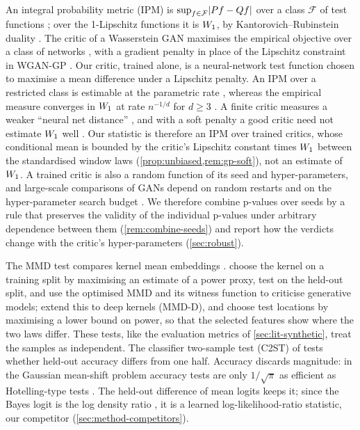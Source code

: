 An integral probability metric (IPM) is $\sup_{f\in\mathcal F}\lvert Pf-Qf\rvert$ over a class
$\mathcal F$ of test functions \citep{muller1997integral}; over the 1-Lipschitz functions it is
$W_{1}$, by Kantorovich--Rubinstein duality \citep{villani2009optimal}. The critic of a Wasserstein GAN maximises the empirical
objective over a class of networks \citep{arjovsky2017wasserstein}, with a gradient penalty in
place of the Lipschitz constraint in WGAN-GP \citep{gulrajani2017improved}. Our critic, trained
alone, is a neural-network test function chosen to maximise a mean difference under a Lipschitz
penalty. An IPM over a restricted class is estimable at the parametric rate
\citep{sriperumbudur2012empirical}, whereas the empirical measure converges in $W_{1}$ at rate
$n^{-1/d}$ for $d\ge3$ \citep{fournier2015rate}. A finite critic measures a weaker ``neural net distance''
\citep{arora2017generalization}, and with a soft penalty a good critic need not estimate $W_{1}$ well
\citep{mallasto2019well}. Our statistic is therefore an IPM over trained critics, whose
conditional mean is bounded by the critic's Lipschitz constant times $W_{1}$ between the standardised
window laws (\cref{prop:unbiased,rem:gp-soft}), not an estimate of $W_{1}$. A trained critic is
also a random function of its seed and hyper-parameters, and large-scale comparisons of GANs
depend on random restarts and on the hyper-parameter search budget \citep{lucic_2018_gans}. We
therefore combine p-values over seeds by a rule that preserves the validity of the individual
p-values under arbitrary dependence between them (\cref{rem:combine-seeds}) and report how the
verdicts change with the critic's hyper-parameters (\cref{sec:robust}).

The MMD test compares kernel mean embeddings \citep{gretton2012kernel}.
 choose the kernel on a training split by maximising an estimate
of a power proxy, test on the held-out split, and use the optimised MMD and its witness function
to criticise generative models; \citet{liu2020learning} extend this to deep kernels (MMD-D), and
\citet{jitkrittum_2016_interpretable} choose test locations by maximising a lower bound on power,
so that the selected features show where the two laws differ. These tests, like the evaluation
metrics of \cref{sec:lit-synthetic}, treat the samples as independent. The classifier
two-sample test (C2ST) of \citet{lopezpaz2017revisiting} tests whether held-out accuracy differs
from one half. Accuracy discards magnitude: in the Gaussian mean-shift problem accuracy tests are
only $1/\sqrt{\pi}$ as efficient as Hotelling-type tests \citep{kim2021classification}. The
held-out difference of mean logits \citep{cheng2022classification} keeps it; since the Bayes logit
is the log density ratio
\citep{goodfellow2014generative,nguyen2010estimating,cranmer2015approximating}, it is a learned
log-likelihood-ratio statistic, our \LRC{} competitor (\cref{sec:method-competitors}).

